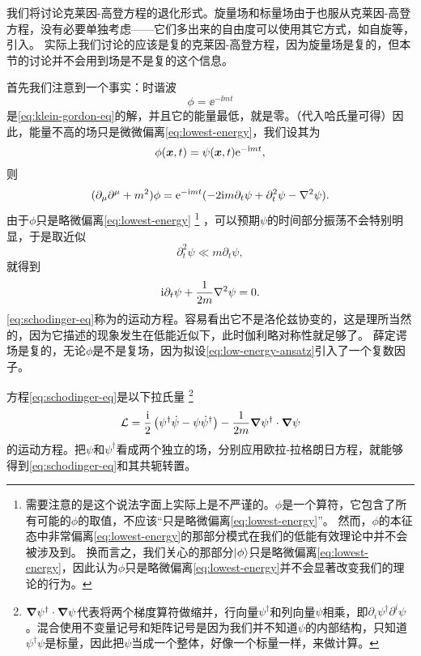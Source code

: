 我们将讨论克莱因-高登方程的退化形式。旋量场和标量场由于也服从克莱因-高登方程，没有必要单独考虑——它们多出来的自由度可以使用其它方式，如自旋等，引入。
实际上我们讨论的应该是复的克莱因-高登方程，因为旋量场是复的，但本节的讨论并不会用到场是不是复的这个信息。

首先我们注意到一个事实：时谐波
\begin{equation}
    \phi = \ee^{- \ii m t}
    \label{eq:lowest-energy}
\end{equation}
是\eqref{eq:klein-gordon-eq}的解，并且它的能量最低，就是零。（代入哈氏量可得）因此，能量不高的场只是微微偏离\eqref{eq:lowest-energy}，我们设其为
\begin{equation}
    \phi(\vb*{x}, t) = \psi(\vb*{x}, t) \mathrm{e}^{- \mathrm{i} m t},
    \label{eq:low-energy-ansatz}
\end{equation}
则
\[
    (\partial_\mu \partial^\mu + m^2) \phi = \ee^{- \ii m t} (-2 \ii m \partial_t \psi + \partial_t^2 \psi - \laplacian{\psi}).
\]
由于$\phi$只是略微偏离\eqref{eq:lowest-energy}%
\footnote{需要注意的是这个说法字面上实际上是不严谨的。${\phi}$是一个算符，它包含了所有可能的$\phi$的取值，不应该“只是略微偏离\eqref{eq:lowest-energy}”。
然而，${\phi}$的本征态中非常偏离\eqref{eq:lowest-energy}的那部分模式在我们的低能有效理论中并不会被涉及到。
换而言之，我们关心的那部分$\ket{\phi}$只是略微偏离\eqref{eq:lowest-energy}，因此认为${\phi}$只是略微偏离\eqref{eq:lowest-energy}并不会显著改变我们的理论的行为。
}%
，可以预期$\psi$的时间部分振荡不会特别明显，于是取近似
\[
    \partial_t^2 \psi \ll m \partial_t \psi,
\]
就得到
\begin{equation}
    \ii \partial_t \psi + \frac{1}{2m} \laplacian{\psi} = 0.
    \label{eq:schodinger-eq}
\end{equation}
\eqref{eq:schodinger-eq}称为的运动方程。容易看出它不是洛伦兹协变的，这是理所当然的，因为它描述的现象发生在低能近似下，此时伽利略对称性就足够了。
薛定谔场是复的，无论$\phi$是不是复场，因为拟设\eqref{eq:low-energy-ansatz}引入了一个复数因子。

方程\eqref{eq:schodinger-eq}是以下拉氏量%
\footnote{$\grad{\psi}^\dagger \cdot \grad{\psi}$代表将两个梯度算符做缩并，行向量$\psi^\dagger$和列向量$\psi$相乘，即$\partial_i \psi^\dagger \partial^i \psi$。混合使用不变量记号和矩阵记号是因为我们并不知道$\psi$的内部结构，只知道$\psi^\dagger \psi$是标量，因此把$\psi$当成一个整体，好像一个标量一样，来做计算。}
\begin{equation}
    \mathcal{L} = \frac{\mathrm{i}}{2} \left( \psi^\dagger \dot{\psi} - \psi \dot{\psi}^\dagger \right) - \frac{1}{2m} \grad{\psi^\dagger} \cdot \grad{\psi}
    \label{eq:schodinger-lagrangian}
\end{equation}
的运动方程。把$\psi$和$\psi^\dagger$看成两个独立的场，分别应用欧拉-拉格朗日方程，就能够得到\eqref{eq:schodinger-eq}和其共轭转置。


